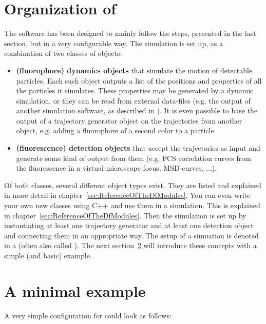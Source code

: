 \section{Organization of \df}
\label{sec:OrganizationOfDf}
The software \df has been designed to mainly follow the steps, presented in the last section, but in a very configurable way. The simulation is set up, as a combination of two classes of objects:
\begin{itemize}
	\item \textbf{(fluorophore) dynamics objects} that simulate the motion of detectable particles. Each such object outputs a list of the positions and properties of all the particles it simulates. These properties may be generated by a dynamic simulation, or they can be read from external data-files (e.g. the output of another simulation software, as described in \cite{WOCJAN2009}). It is even possible to base the output of a trajectory generator object on the trajectories from another object, e.g. adding a fluorophore of a second color to a particle. 
	\item \textbf{(fluorescence) detection objects} that accept the trajectories as input and generate some kind of output from them (e.g. FCS correlation curves from the fluorescence in a virtual microscope focus, MSD-curves, ...).
\end{itemize}
Of both classes, several different object types exist. They are listed and explained in more detail in chapter~\ref{sec:ReferenceOfTheDfModules}. You can even write your own new classes using C++ and use them in a simulation. This is explained in chapter~\ref{sec:ReferenceOfTheDfModules}. Then the simulation is set up by instantiating at least one trajectory generator and at least one detection object and connecting them in an appropriate way. The setup of a simuation is denoted in a  (often also called ). The next section~\ref{sec:AMinimalExample} will introduce these concepts with a simple (and basic) example.

\section{A minimal example}
\label{sec:AMinimalExample}
A very simple configuration for \df could look as follows:


